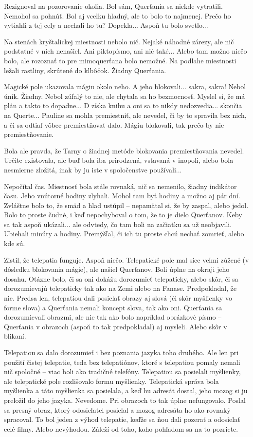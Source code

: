 \documentclass{book}
\begin{document}
Rezignoval na pozorovanie okolia. Bol sám, Querťania sa niekde vytratili. Nemohol sa pohnúť. Bol aj vcelku hladný, ale to bolo to najmenej. Prečo ho vytiahli z tej cely a nechali ho tu? Dopekla... Aspoň tu bolo svetlo...

Na stenách kryštalickej miestnosti nebolo nič. Nejaké náhodné zárezy, ale nič podstatné v nich nenašiel. Ani piktopísmo, ani nič také... Alebo tam možno niečo bolo, ale rozoznať to pre mimoquerťana bolo nemožné. Na podlahe miestnosti ležali rastliny, skrútené do klbôčok. Žiadny Querťania.

Magické pole ukazovala mágiu okolo neho. A jeho blokovali... sakra, sakra! Nebol únik. Žiadny. Nebol zúfalý to nie, ale chytala sa ho bezmocnosť. Myslel si, že má plán a takto to dopadne... D získa knihu a oni sa to nikdy nedozvedia... skončia na Querte... Pauline sa mohla premiestniť, ale nevedel, či by to spravila bez nich, a či sa odtiaľ vôbec premiestňovať dalo. Mágiu blokovali, tak prečo by nie premiestňovanie.

Bola ale pravda, že Tarny o žiadnej metóde blokovania premiestňovania nevedel. Určite existovala, ale buď bola iba prirodzená, vstavaná v inopoli, alebo bola nesmierne zložitá, inak by ju iste v spoločenstve používali...

Nepočítal čas. Miestnosť bola stále rovnaká, nič sa nemenilo, žiadny indikátor času. Jeho vnútorné hodiny zlyhali. Mohol tam byť hodiny a možno aj pár dní. Zvláštne bolo to, že smäd a hlad ustúpil – nepamätal si, že by zaspal, alebo jedol. Bolo to proste čudné, i keď nepochyboval o tom, že to je dielo Querťanov. Keby sa tak aspoň ukázali... ale odvtedy, čo tam boli na začiatku sa už neobjavili. Ubiehali minúty a hodiny. Premýšľal, či ich tu proste chcú nechať zomrieť, alebo kde sú.

Zistil, že telepatia funguje. Aspoň niečo. Telepatické pole mal síce veľmi zúžené (v dôsledku blokovania mágie), ale našiel Querťanov. Boli úplne na okraji jeho dosahu. Otázne bolo, či sa oni dokážu dorozumieť telepaticky, alebo skôr, či sa dorozumievajú telepaticky tak ako na Zemi alebo na Fanase. Predpokladal, že nie. Predsa len, telepatiou dali posielať obrazy aj slová (či skôr myšlienky vo forme slova) a Querťania nemali koncept slova, tak ako oni. Querťania sa dorozumievali obrazmi, ale nie tak ako bolo napríklad obrázkové písmo – Querťania v obrazoch (aspoň to tak predpokladal) aj mysleli. Alebo skôr v blikaní.

Telepatiou sa dalo dorozumieť i bez poznania jazyka toho druhého. Ale len pri použití čistej telepatie, teda bez telepatiónov, ktoré s telepatiou pomaly nemali nič spoločné – viac boli ako tradičné telefóny. Telepatiou sa posielali myšlienky, ale telepatické pole rozlišovalo formu myšlienky. Telepatická správa bola myšlienka a táto myšlienka sa posielala, a keď hu adresát dostal, jeho mozog si ju preložil do jeho jazyka. Nevedome. Pri obrazoch to tak úplne nefungovalo. Poslal sa presný obraz, ktorý odosielateľ posielal a mozog adresáta ho ako rovnaký spracoval. To bol jeden z výhod telepatie, keďže sa ňou dali pozerať a odosielať celé filmy. Alebo nevýhodou. Záleží od toho, koho pohľadom sa na to pozriete.
\end{document}
